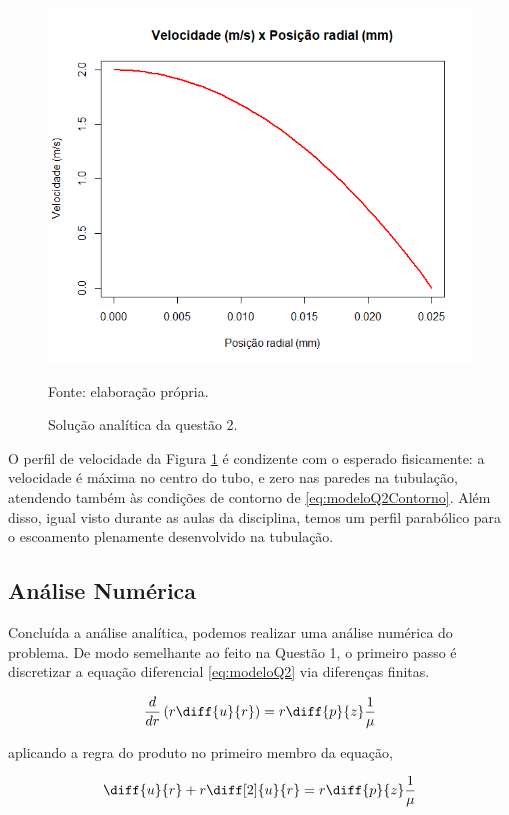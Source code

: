 \begin{figure}[h!]
    \caption{Solução analítica da questão 2.}
    \label{fig:graficoAnaliticoQ2}
    \centering
    \centerline{\includegraphics[scale=0.5]{graficoAnaliticoQ2.png}}
    \par{Fonte: elaboração própria.}
\end{figure}

O perfil de velocidade da Figura \ref*{fig:graficoAnaliticoQ2} é condizente com o 
esperado fisicamente: a velocidade é máxima no centro do tubo, e zero nas paredes na tubulação,
atendendo também às condições de contorno de \eqref{eq:modeloQ2Contorno}.
Além disso, igual visto durante as aulas da disciplina, temos um perfil parabólico para o 
escoamento plenamente desenvolvido na tubulação.

\subsection{Análise Numérica}

Concluída a análise analítica, podemos realizar uma análise numérica do problema. De modo semelhante
ao feito na Questão 1, o primeiro passo é discretizar a equação diferencial \eqref{eq:modeloQ2} via 
diferenças finitas.

\[ \frac{d}{dr} \left(r\diff{u}{r}\right) = r \diff{p}{z} \frac{1}{\mu} \]

\noindent aplicando a regra do produto no primeiro membro da equação,

\[ \diff{u}{r} + r \diff[2]{u}{r} = r \diff{p}{z} \frac{1}{\mu} \]

